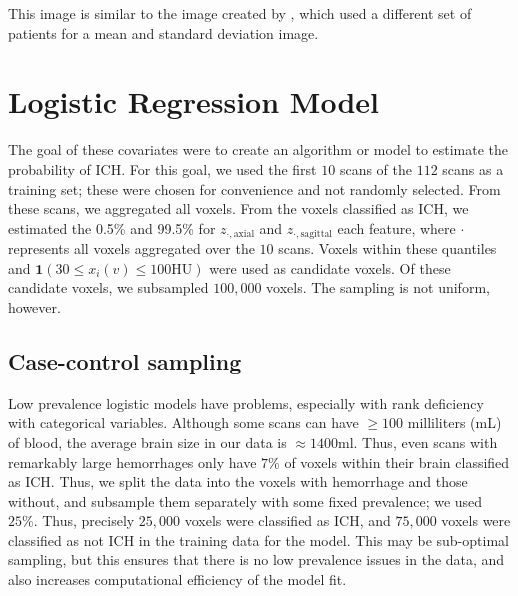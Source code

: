 \documentclass[12pt]{report}
\begin{document}
\begin{refsection}
This image is similar to the image created by \citet{gillebert_automated_2014}, which used a different set of patients for a mean and standard deviation image.  



\section{Logistic Regression Model}
The goal of these covariates were to create an algorithm or model to estimate the probability of ICH.  For this goal, we used the first $10$ scans of the $112$ scans as a training set; these were chosen for convenience and not randomly selected.  From these scans, we aggregated all voxels.  From the voxels classified as ICH, we estimated the 0.5\% and 99.5\% for $z_{\cdot, \text{axial}}$ and $z_{\cdot, \text{sagittal}}$ each feature, where $\cdot$ represents all voxels aggregated over the $10$ scans.  Voxels within these quantiles and $\mathbf{1}(30 \leq x_{i}(v) \leq 100 \text{HU})$ were used as candidate voxels.  Of these candidate voxels, we subsampled $100,000$ voxels.  The sampling is not uniform, however.

\subsection{Case-control sampling}
Low prevalence logistic models have problems, especially with rank deficiency with categorical variables.  Although some scans can have $\geq 100$ milliliters (mL) of blood, the average brain size in our data is $\approx 1400$ml.  Thus, even scans with remarkably large hemorrhages only have $7\%$ of voxels within their brain classified as ICH.  Thus, we split the data into the voxels with hemorrhage and those without, and subsample them separately with some fixed prevalence; we used $25\%$.  Thus, precisely $25,000$ voxels were classified as ICH, and $75,000$ voxels were classified as not ICH in the training data for the model.  This may be sub-optimal sampling, but this ensures that there is no low prevalence issues in the data, and also increases computational efficiency of the model fit.


\end{refsection}
\end{document}
